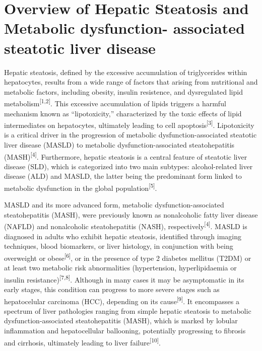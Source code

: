 \documentclass[
  11pt,
  letterpaper,
]{book}
\begin{document}
\section{Overview of Hepatic Steatosis and Metabolic dysfunction-
associated steatotic liver
disease}\label{overview-of-hepatic-steatosis-and-metabolic-dysfunction--associated-steatotic-liver-disease}

Hepatic steatosis, defined by the excessive accumulation of
triglycerides within hepatocytes, results from a wide range of factors
that arising from nutritional and metabolic factors, including obesity,
insulin resistence, and dysregulated lipid
metabolism\textsuperscript{{[}1,2{]}}. This excessive accumulation of
lipids triggers a harmful mechanism known as ``lipotoxicity,''
characterized by the toxic effects of lipid intermediates on
hepatocytes, ultimately leading to cell
apoptosis\textsuperscript{{[}3{]}}. Lipotoxicity is a critical driver in
the progression of metabolic dysfunction-associated steatotic liver
disease (MASLD) to metabolic dysfunction-associated steatohepatitis
(MASH)\textsuperscript{{[}4{]}}. Furthermore, hepatic steatosis is a
central feature of steatotic liver disease (SLD), which is categorized
into two main subtypes: alcohol-related liver disease (ALD) and MASLD,
the latter being the predominant form linked to metabolic dysfunction in
the global population\textsuperscript{{[}5{]}}.

MASLD and its more advanced form, metabolic dysfunction-associated
steatohepatitis (MASH), were previously known as nonalcoholic fatty
liver disease (NAFLD) and nonalcoholic steatohepatitis (NASH),
respectively\textsuperscript{{[}4{]}}. MASLD is diagnosed in adults who
exhibit hepatic steatosis, identified through imaging techniques, blood
biomarkers, or liver histology, in conjunction with being overweight or
obese\textsuperscript{{[}6{]}}, or in the presence of type 2 diabetes
mellitus (T2DM) or at least two metabolic risk abnormalities
(hypertension, hyperlipidaemia or insulin
resistance)\textsuperscript{{[}7,8{]}}. Although in many cases it may be
asymptomatic in its early stages, this condition can progress to more
severe stages such as hepatocelular carcinoma (HCC), depending on its
cause\textsuperscript{{[}9{]}}. It encompasses a spectrum of liver
pathologies ranging from simple hepatic steatosis to metabolic
dysfunction-associated steatohepatitis (MASH), which is marked by
lobular inflammation and hepatocellular ballooning, potentially
progressing to fibrosis and cirrhosis, ultimately leading to liver
failure\textsuperscript{{[}10{]}}.
\end{document}
